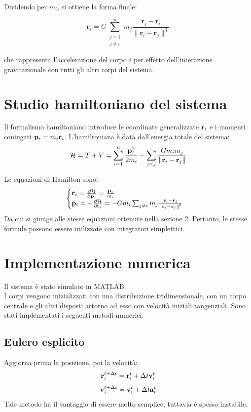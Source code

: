 \documentclass[a4paper,12pt]{article}
\begin{document}
Dividendo per \( m_i \), si ottiene la forma finale:

\[
\ddot{\mathbf{r}}_i = G \sum_{\substack{j=1 \\ j \ne i}}^n m_j \frac{\mathbf{r}_j - \mathbf{r}_i}{\|\mathbf{r}_i - \mathbf{r}_j\|^3}
\]

che rappresenta l'accelerazione del corpo \( i \) per effetto dell'interazione gravitazionale con tutti gli altri corpi del sistema.

\section{Studio hamiltoniano del sistema}
Il formalismo hamiltoniano introduce le coordinate generalizzate $\vb{r}_i$ e i momenti coniugati $\vb{p}_i = m_i \dot{\vb{r}}_i$. L'hamiltoniana \`e data dall'energia totale del sistema:
\begin{equation}
    \mathcal{H} = T + V = \sum_{i=1}^n \frac{\vb{p}_i^2}{2m_i} - \sum_{i<j} \frac{G m_i m_j}{\norm{\vb{r}_i - \vb{r}_j}}
\end{equation}

Le equazioni di Hamilton sono:
\begin{equation}
\begin{cases}
    \dot{\vb{r}}_i = \pdv{\mathcal{H}}{\vb{p}_i} = \frac{\vb{p}_i}{m_i} \\
    \dot{\vb{p}}_i = -\pdv{\mathcal{H}}{\vb{r}_i} = -G m_i \sum_{j \neq i} m_j \frac{\vb{r}_i - \vb{r}_j}{\norm{\vb{r}_i - \vb{r}_j}^3}
\end{cases}
\end{equation}
Da cui si giunge alle stesse equazioni ottenute nella sezione 2. Pertanto, le stesse formule possono essere utilizzate con integratori simplettici.

\section{Implementazione numerica}
Il sistema \`e stato simulato in MATLAB. \\I corpi vengono inizializzati con una distribuzione tridimensionale, con un corpo centrale e gli altri disposti attorno ad esso con velocit\`a iniziali tangenziali. Sono stati implementati i seguenti metodi numerici:

\subsection*{Eulero esplicito}
Aggiorna prima la posizione, poi la velocit\`a:
\begin{equation}
    \vb{r}_i^{t+\Delta t} = \vb{r}_i^t + \Delta t \vb{v}_i^t
\end{equation}
\begin{equation}
    \vb{v}_i^{t+\Delta t} = \vb{v}_i^t + \Delta t \vb{a}_i^t
\end{equation}
Tale metodo ha il vantaggio di essere molto semplice, tuttavia è spesso instabile.
\end{document}
